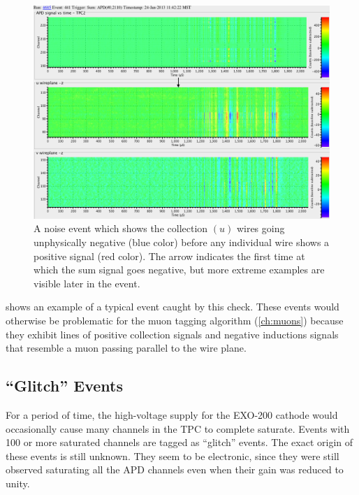 \documentclass[herrin-thesis.tex]{subfiles}
\begin{document}
\begin{figure}[tbp]
\centering
\includegraphics[width=\columnwidth]{./plots/noise_eventdisplay_run_4685_ev_0441_annotated.png}
\caption[Collection wires going negative noise]{A noise event which shows the collection \((u)\) wires going unphysically negative (blue color) before any individual wire shows a positive signal (red color). The arrow indicates the first time at which the sum signal goes negative, but more extreme examples are visible later in the event.}
\label{fig:noise_sum_u_neg}
\end{figure}

 shows an example of a typical event caught by this check. These events would otherwise be problematic for the muon tagging algorithm (\cref{ch:muons}) because they exhibit lines of positive collection signals and negative inductions signals that resemble a muon passing parallel to the wire plane.

\subsection{``Glitch'' Events}
For a period of time, the high-voltage supply for the EXO-200 cathode would occasionally cause many channels in the TPC to complete saturate. Events with 100 or more saturated channels are tagged as ``glitch'' events. The exact origin of these events is still unknown. They seem to be electronic, since they were still observed saturating all the APD channels even when their gain was reduced to unity.
\end{document}

